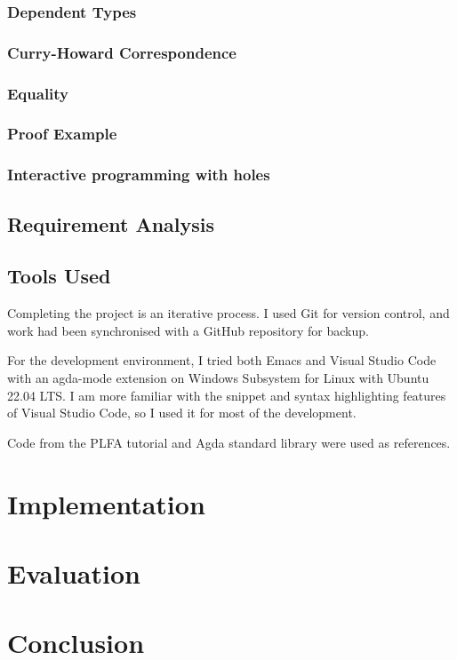\documentclass[12pt,twoside,a4paper]{report}
\theoremstyle{definition}
\begin{document}
        \subsection{Dependent Types}

        \subsection{Curry-Howard Correspondence}

        \subsection{Equality}

        \subsection{Proof Example}
        
        \subsection{Interactive programming with holes}

        \section{Requirement Analysis}

    \section{Tools Used}
    Completing the project is an iterative process. I used Git \cite{git} for version control, and work had been synchronised with a GitHub \cite{github} repository for backup.

    For the development environment, I tried both Emacs \cite{emacs} and Visual Studio Code \cite{vscode} with an agda-mode extension \cite{agda_mode} on Windows Subsystem for Linux with Ubuntu \cite{wsl_ubuntu} 22.04 LTS. I am more familiar with the snippet and syntax highlighting features of Visual Studio Code, so I used it for most of the development. 

    Code from the PLFA tutorial and Agda standard library \cite{agda_std} were used as references. 

\chapter{Implementation}

\chapter{Evaluation}

\chapter{Conclusion}

    \printbibliography
\end{document}
